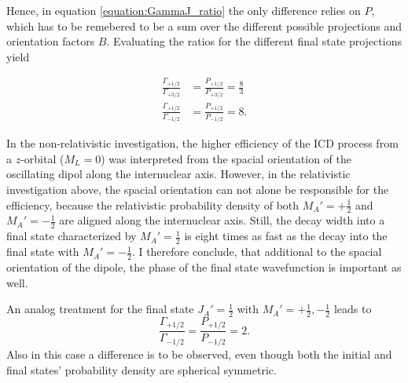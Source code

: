 Hence, in equation \ref{equation:GammaJ_ratio} the only difference relies on $P$,
which has to be remebered to be a sum over the different possible projections
and orientation factors $B$. Evaluating the ratios for the different final state
projections yield

\begin{align}
  \frac{\Gamma_{+1/2}}{\Gamma_{+3/2}} &= \frac{P_{+1/2}}{P_{+3/2}} = \frac 83  \\
  \frac{\Gamma_{+1/2}}{\Gamma_{-1/2}} &= \frac{P_{+1/2}}{P_{-1/2}} = 8   .
\end{align}

In the non-relativistic investigation, the higher efficiency of the \ac{ICD} process
from a $z$-orbital ($M_L=0$) was interpreted from the spacial orientation of the
oscillating dipol along the internuclear axis.
However, in the relativistic investigation above, the spacial orientation
can not alone be responsible for the efficiency, because the relativistic
probability density of both $M_A'= +\frac 12$ and $M_A'= -\frac 12$ are aligned
along the internuclear axis. Still, the decay width into a final state characterized
by $M_A'= \frac 12$ is eight times as fast as the decay into the final state
with $M_A'= -\frac 12$. I therefore conclude, that additional to the spacial
orientation of the dipole, the phase of the final state wavefunction is
important as well.

An analog treatment for the final state $J_A'=\frac 12$ with $M_A'= +\frac 12, -\frac 12$
leads to
\begin{equation}
  \frac{\Gamma_{+1/2}}{\Gamma_{-1/2}} = \frac{P_{+1/2}}{P_{-1/2}} = 2  .
\end{equation}
Also in this case a difference is to be observed, even though both the initial
and final states' probability density are spherical symmetric.

%
%
%
%
%
%
%
%
